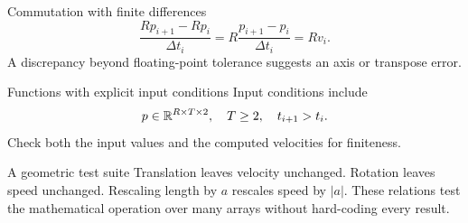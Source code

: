 \documentclass[aspectratio=169,11pt]{beamer}
\newcommand{\notestarget}{notes.pdf}\newcommand{\noteslabel}{Notes}
\begin{document}
\renewcommand{\notestarget}{notes.pdf\#note-orthogonality-and-length-preservation}
\begin{frame}[t,fragile,label=slide-commutation-with-finite-differences]{Commutation with finite differences}
\[
\frac{Rp_{i+1}-Rp_i}{\Delta t_i}
=R\frac{p_{i+1}-p_i}{\Delta t_i}=Rv_i.
\]
\pause{}
A discrepancy beyond floating-point tolerance suggests an axis or transpose error.
\end{frame}
\renewcommand{\notestarget}{notes.pdf\#note-functions-with-explicit-input-conditions}
\begin{frame}[t,fragile,label=slide-functions-with-explicit-input-conditions]{Functions with explicit input conditions}
Input conditions include
\[
p\in\mathbb{R}^{R\times T\times2},\quad T\geq2,\quad t_{i+1}>t_i.
\]
\pause{}
Check both the input values and the computed velocities for finiteness.
\end{frame}
\renewcommand{\notestarget}{notes.pdf\#note-functions-with-explicit-input-conditions}
\begin{frame}[t,fragile,label=slide-a-geometric-test-suite]{A geometric test suite}
Translation leaves velocity unchanged. Rotation leaves speed unchanged. Rescaling length by $a$ rescales speed by $|a|$.
\pause{}
These relations test the mathematical operation over many arrays without hard-coding every result.
\end{frame}
\end{document}

